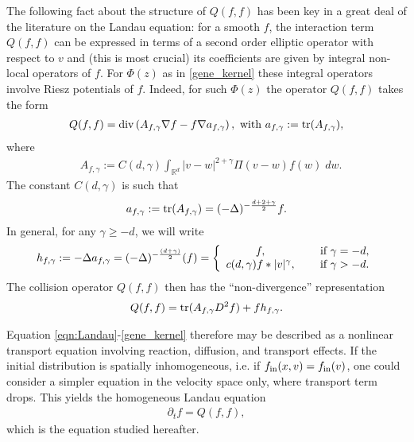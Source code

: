 \documentclass[12pt,american]{amsart}
\numberwithin{equation}{section}
\theoremstyle{plain}
\theoremstyle{definition}                  %
\def\tr{\textnormal{tr}}
\def\dive{\textnormal{div}}
\def\fin{f_{\textnormal{in}}}
\begin{document}
  The following fact about the structure of $Q(f,f)$ has been key in a great deal of the literature on the Landau equation: for a smooth $f$, the interaction term $Q(f,f)$ can be expressed in terms of a second order elliptic operator with respect to $v$ and (this is most crucial) its coefficients are given by integral non-local operators of $f$. For $\Phi(z) $ as in \eqref{gene_kernel} these integral operators involve Riesz potentials of $f$. Indeed, for such $\Phi(z)$ the operator $Q(f,f)$ takes the form
  \begin{align*}
   Q(f,f)= \dive \left (A_{f,\gamma}\nabla f-f\nabla a_{f,\gamma} \right), \textnormal{ with } a_{f,\gamma} := \tr(A_{f,\gamma}),
  \end{align*}
  where
\begin{align}\label{Af_gamma}
  & A_{f,\gamma} := C(d,\gamma) \int_{\mathbb{R}^d} |v-w|^{2+\gamma}\Pi(v-w)f(w) \;dw.
\end{align}
The constant $C(d,\gamma)$ is such that
\begin{align*}
  a_{f,\gamma} := \tr(A_{f,\gamma}) = (-\Delta)^{-\frac{d+2+\gamma}{2}}f.
\end{align*}
In general, for any $\gamma \geq -d$, we will write
\begin{align}\label{hf_gamma}
    h_{f,\gamma}:=  -\Delta a_{f,\gamma} =  (-\Delta)^{-\frac{(d+\gamma)}{2}}(f) = \left\{  \begin{array}{cl} 
                        f, & \quad \textnormal{ if } \gamma=-d,\\ 
                         c(d,\gamma) f * |v|^{\gamma}, &  \quad \textnormal{ if } \gamma>-d.              \end{array}  \right.
\end{align}
The collision operator $Q(f,f) $ then has the ``non-divergence'' representation 
\begin{align*}
  Q(f,f) = \tr(A_{f,\gamma}D^2f)+fh_{f,\gamma}.
\end{align*}


Equation \eqref{eqn:Landau}-\eqref{gene_kernel}  therefore may be described as a nonlinear transport equation involving reaction, diffusion, and transport effects. If the initial distribution is spatially inhomogeneous, i.e. if $\fin(x,v) = \fin(v)$, one could consider a simpler equation in the velocity space only, where transport term drops. This yields the homogeneous Landau equation
\begin{align}\label{eqn:Landau homogeneous}
  \partial_tf = Q(f,f),
\end{align}
which is the equation studied hereafter.
\end{document}
